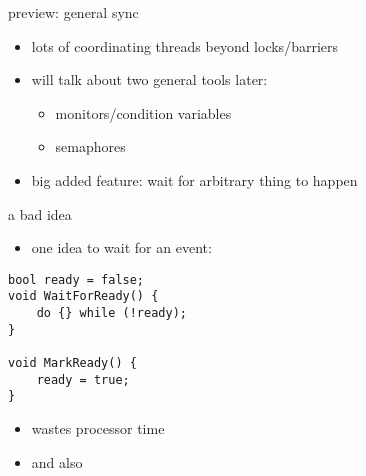 \begin{frame}{preview: general sync}
    \begin{itemize}
    \item lots of coordinating threads beyond locks/barriers
    \item will talk about two general tools later:
        \begin{itemize}
        \item monitors/condition variables
        \item semaphores
        \end{itemize}
    \item big added feature: wait for arbitrary thing to happen
    \end{itemize}
\end{frame}

\begin{frame}[fragile]{a bad idea}
\begin{itemize}
\item one  idea to wait for an event:
\end{itemize}
\begin{lstlisting}
bool ready = false;
void WaitForReady() {
    do {} while (!ready);
}

void MarkReady() {
    ready = true;
}
\end{lstlisting}
\begin{itemize}
\item wastes processor time
\item and also 
\end{itemize}
\end{frame}
